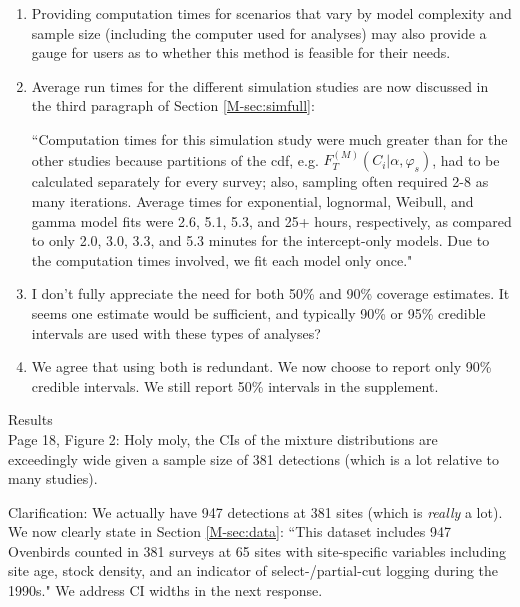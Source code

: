 \documentclass[12pt]{article}
\renewenvironment{quote}  %
              {\list{}{\rightmargin\leftmargin}\normalfont%
               \item\relax}
              {\endlist}
\newcommand{\Fm}{F_T^{(M)}}
\begin{document}
\begin{enumerate}
\item Providing computation times for scenarios that vary by model complexity and sample size (including the computer used for analyses) may also provide a gauge for users as to whether this method is feasible for their needs.
\begin{quote}
Average run times for the different simulation studies are now discussed in the third paragraph of Section \ref{M-sec:simfull}:

``Computation times for this simulation study were much greater than for the other studies because partitions of the cdf, e.g. $\Fm(C_i|\alpha,\varphi_s)$, had to be calculated separately for every survey; also, sampling often required 2-8 as many iterations.
Average times for exponential, lognormal, Weibull, and gamma model fits were 2.6, 5.1, 5.3, and 25+ hours, respectively, as compared to only 2.0, 3.0, 3.3, and 5.3 minutes for the intercept-only models.
Due to the computation times involved, we fit each model only once."
\end{quote}

\item I don’t fully appreciate the need for both 50\% and 90\% coverage estimates.  It seems one estimate would be sufficient, and typically 90\% or 95\% credible intervals are used with these types of analyses?
\begin{quote}
We agree that using both is redundant.
We now choose to report only 90\% credible intervals.
We still report 50\% intervals in the supplement.
\end{quote}
\end{enumerate}

Results\\
Page 18, Figure 2:  Holy moly, the CIs of the mixture distributions are exceedingly wide given a sample size of 381 detections (which is a lot relative to many studies).
\begin{quote}
Clarification: We actually have 947 detections at 381 sites (which is \textit{really} a lot).
We now clearly state in Section \ref{M-sec:data}: ``This dataset includes 947 Ovenbirds counted in 381 surveys at 65 sites with site-specific variables including site age,  stock density, and an indicator of select-/partial-cut logging during the 1990s."
We address CI widths in the next response.
\end{quote}
\end{document}
